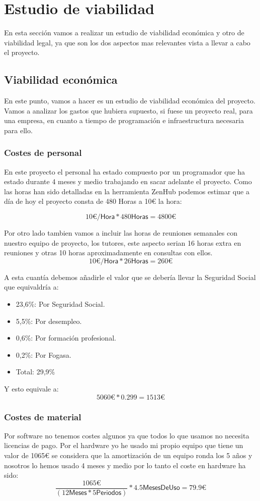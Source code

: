 \section{Estudio de viabilidad}
En esta sección vamos a realizar un estudio de viabilidad económica y otro de viabilidad legal, ya que son los dos aspectos mas relevantes vista a llevar a cabo el proyecto.
\subsection{Viabilidad económica}
En este punto, vamos a hacer es un estudio de viabilidad económica del proyecto. Vamos a analizar los gastos que hubiera supuesto, si fuese un proyecto real, para una empresa, en cuanto a tiempo de programación e infraestructura necesaria para ello.
\subsubsection{Costes de personal}
En este proyecto el personal ha estado compuesto por un programador que ha estado durante 4 meses y medio trabajando en sacar adelante el proyecto.
Como las horas han sido detalladas en la herramienta ZenHub podemos estimar que a día de hoy el proyecto consta de 480 Horas a 10\euro{} la hora:

\[10{\euro{}} /\textsf{Hora}*480\textsf{Horas}=4800{\euro{}} \]

Por otro lado tambien vamos a incluir las horas de reuniones semanales con nuestro equipo de proyecto, los tutores, este aspecto serian 16 horas extra en reuniones y otras 10 horas aproximadamente en consultas con ellos.
\[10{\euro{}} /\textsf{Hora}*26\textsf{Horas}=260{\euro{}} \]

A esta cuantía debemos añadirle el valor que se debería llevar la Seguridad Social que equivaldría a:
\begin{itemize}
\item 23,6\%: Por Seguridad Social.
\item 5,5\%: Por desempleo.
\item 0,6\%: Por formación profesional.
\item 0,2\%: Por Fogasa.
\item Total: 29,9\% 
\end{itemize}
Y esto equivale a: 
\[5060\euro{}*0.299=1513\euro{}\]
\subsubsection{Costes de material}
Por software no tenemos costes algunos ya que todos lo que usamos no necesita licencias de pago.
Por el hardware yo he usado mi propio equipo que tiene un valor de 1065\euro{} se considera que la amortización de un equipo ronda los 5 años y nosotros lo hemos usado 4 meses y medio por lo tanto el coste en hardware ha sido: 
\[\frac{1065\euro{}}{(12\textsf{Meses}*5\textsf{Periodos})}*4.5\textsf{MesesDeUso}=79.9\euro{}\]
